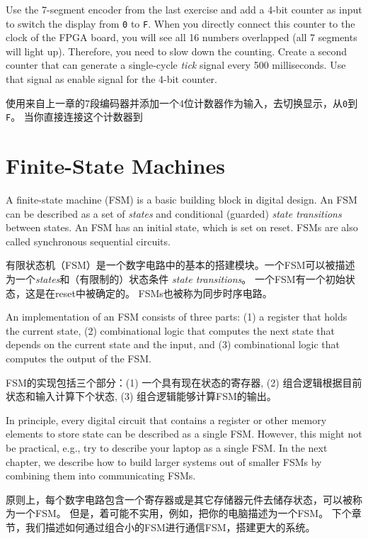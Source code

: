 \documentclass[%
    10pt,
    headinclude, footexclude,
    openright, %
    notitlepage,
    cleardoubleempty,
    headsepline,
    pointlessnumbers,
    bibtotoc, idxtotoc,
    ]{scrbook}
\newcommand{\code}[1]{{\small{\texttt{#1}}}}
\newcommand{\todo}[1]{{\emph{TODO: #1}}}
\renewcommand{\todo}[1]{}
\begin{document}
Use the 7-segment encoder from the last exercise and add a 4-bit counter as input
to switch the display from \code{0} to \code{F}. When you directly connect this
counter to the clock of the FPGA board, you will see all 16 numbers
overlapped (all 7 segments will light up).
Therefore, you need to slow down the counting. Create a second
counter that can generate a single-cycle \emph{tick} signal every 500 milliseconds.
Use that signal as enable signal for the 4-bit counter.

使用来自上一章的7段编码器并添加一个4位计数器作为输入，去切换显示，从\code{0}到\code{F}。
当你直接连接这个计数器到

\todo{Luca: More exercises would be nice. Maybe in the future?}

\chapter{Finite-State Machines}

A finite-state machine (FSM) is a basic building block in digital design.
An FSM can be described as a set of \emph{states} and conditional (guarded)
\emph{state transitions} between states. 
An FSM has an initial state, which is set on reset.
FSMs are also called synchronous sequential circuits.

有限状态机（FSM）是一个数字电路中的基本的搭建模块。一个FSM可以被描述为一个\emph{states}和（有限制的）状态条件
\emph{state transitions}。
一个FSM有一个初始状态，这是在reset中被确定的。
FSMs也被称为同步时序电路。


An implementation of an FSM consists of three parts: (1) a register that holds the current state,
(2) combinational logic that computes the next state that depends on the current
state and the input, and (3) combinational logic that computes the output of the FSM.

FSM的实现包括三个部分：(1) 一个具有现在状态的寄存器,
(2) 组合逻辑根据目前状态和输入计算下个状态,  
(3) 组合逻辑能够计算FSM的输出。

In principle, every digital circuit that contains a register or other memory elements
to store state can be described as a single FSM. However, this might
not be practical, e.g., try to describe your laptop as a single FSM.
In the next chapter, we describe how to build larger systems
out of smaller FSMs by combining them into communicating FSMs.

原则上，每个数字电路包含一个寄存器或是其它存储器元件去储存状态，可以被称为一个FSM。
但是，着可能不实用，例如，把你的电脑描述为一个FSM。
下个章节，我们描述如何通过组合小的FSM进行通信FSM，搭建更大的系统。
\end{document}

